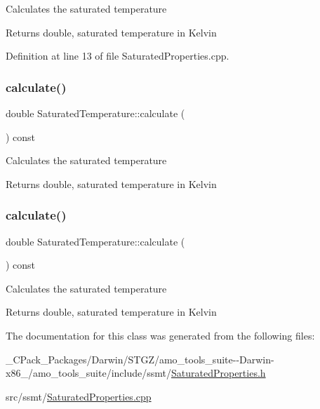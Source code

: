 Calculates the saturated temperature

\begin{DoxyReturn}{Returns}
double, saturated temperature in Kelvin 
\end{DoxyReturn}


Definition at line 13 of file Saturated\+Properties.\+cpp.

\mbox{\label{class_saturated_temperature_a4aa0d2a337289dd36f4e063f1f67aaa5}} 
\subsubsection{\texorpdfstring{calculate()}{calculate()}\hspace{0.1cm}{\footnotesize\ttfamily [2/3]}}
{\footnotesize\ttfamily double Saturated\+Temperature\+::calculate (\begin{DoxyParamCaption}{ }\end{DoxyParamCaption}) const}

Calculates the saturated temperature

\begin{DoxyReturn}{Returns}
double, saturated temperature in Kelvin 
\end{DoxyReturn}
\mbox{\label{class_saturated_temperature_a4aa0d2a337289dd36f4e063f1f67aaa5}} 
\subsubsection{\texorpdfstring{calculate()}{calculate()}\hspace{0.1cm}{\footnotesize\ttfamily [3/3]}}
{\footnotesize\ttfamily double Saturated\+Temperature\+::calculate (\begin{DoxyParamCaption}{ }\end{DoxyParamCaption}) const}

Calculates the saturated temperature

\begin{DoxyReturn}{Returns}
double, saturated temperature in Kelvin 
\end{DoxyReturn}


The documentation for this class was generated from the following files\+:\begin{DoxyCompactItemize}
\item 
\+\_\+\+C\+Pack\+\_\+\+Packages/\+Darwin/\+S\+T\+G\+Z/amo\+\_\+tools\+\_\+suite-\/-\/\+Darwin-\/x86\+\_/amo\+\_\+tools\+\_\+suite/include/ssmt/\hyperlink{___c_pack___packages_2_darwin_2_s_t_g_z_2amo__tools__suite--_darwin-x86__64_2amo__tools__suite_2b97ccf799ea6561aa4d6a618c8073459}{Saturated\+Properties.\+h}\item 
src/ssmt/\hyperlink{_saturated_properties_8cpp}{Saturated\+Properties.\+cpp}\end{DoxyCompactItemize}
